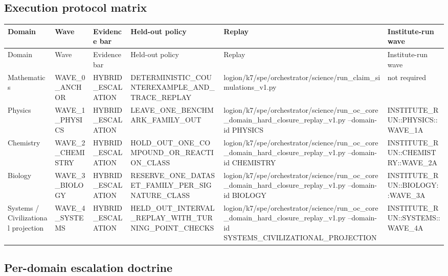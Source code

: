\subsection{Execution protocol matrix}
\begin{longtable}{p{}p{}p{}p{}p{}p{}}
\toprule
Domain & Wave & Evidence bar & Held-out policy & Replay & Institute-run wave \\
\midrule
\endfirsthead
\toprule
Domain & Wave & Evidence bar & Held-out policy & Replay & Institute-run wave \\
\midrule
\endhead
Mathematics & WAVE\_0\_ANCHOR & HYBRID\_ESCALATION & DETERMINISTIC\_COUNTEREXAMPLE\_AND\_TRACE\_REPLAY & logion/k7/spe/orchestrator/science/run\_claim\_simulations\_v1.py & not required \\
Physics & WAVE\_1\_PHYSICS & HYBRID\_ESCALATION & LEAVE\_ONE\_BENCHMARK\_FAMILY\_OUT & logion/k7/spe/orchestrator/science/run\_oc\_core\_domain\_hard\_closure\_replay\_v1.py --domain-id PHYSICS & INSTITUTE\_RUN::PHYSICS::WAVE\_1A \\
Chemistry & WAVE\_2\_CHEMISTRY & HYBRID\_ESCALATION & HOLD\_OUT\_ONE\_COMPOUND\_OR\_REACTION\_CLASS & logion/k7/spe/orchestrator/science/run\_oc\_core\_domain\_hard\_closure\_replay\_v1.py --domain-id CHEMISTRY & INSTITUTE\_RUN::CHEMISTRY::WAVE\_2A \\
Biology & WAVE\_3\_BIOLOGY & HYBRID\_ESCALATION & RESERVE\_ONE\_DATASET\_FAMILY\_PER\_SIGNATURE\_CLASS & logion/k7/spe/orchestrator/science/run\_oc\_core\_domain\_hard\_closure\_replay\_v1.py --domain-id BIOLOGY & INSTITUTE\_RUN::BIOLOGY::WAVE\_3A \\
Systems / Civilizational projection & WAVE\_4\_SYSTEMS & HYBRID\_ESCALATION & HELD\_OUT\_INTERVAL\_REPLAY\_WITH\_TURNING\_POINT\_CHECKS & logion/k7/spe/orchestrator/science/run\_oc\_core\_domain\_hard\_closure\_replay\_v1.py --domain-id SYSTEMS\_CIVILIZATIONAL\_PROJECTION & INSTITUTE\_RUN::SYSTEMS::WAVE\_4A \\
\bottomrule
\end{longtable}

\subsection{Per-domain escalation doctrine}
